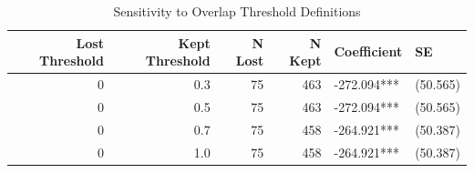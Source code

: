 \begin{table}[!h]
\centering
\caption{\label{tab:tab:thresholds}Sensitivity to Overlap Threshold Definitions}
\centering
\begin{tabular}[t]{rrrrll}
\toprule
Lost Threshold & Kept Threshold & N Lost & N Kept & Coefficient & SE\\
\midrule
0 & 0.3 & 75 & 463 & -272.094*** & (50.565)\\
0 & 0.5 & 75 & 463 & -272.094*** & (50.565)\\
0 & 0.7 & 75 & 458 & -264.921*** & (50.387)\\
0 & 1.0 & 75 & 458 & -264.921*** & (50.387)\\
\bottomrule
\end{tabular}
\end{table}
